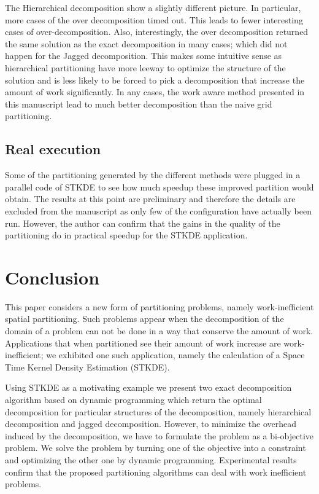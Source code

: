 \documentclass[10pt, conference, compsocconf]{IEEEtran}
\begin{document}
The Hierarchical decomposition show a slightly different picture. In
particular, more cases of the over decomposition timed out. This leads
to fewer interesting cases of over-decomposition. Also, interestingly,
the over decomposition returned the same solution as the exact
decomposition in many cases; which did not happen for the Jagged
decomposition. This makes some intuitive sense as hierarchical
partitioning have more leeway to optimize the structure of the
solution and is less likely to be forced to pick a decomposition that
increase the amount of work significantly. In any cases, the work aware
method presented in this manuscript lead to much better decomposition
than the naive grid partitioning.

\subsection{Real execution}

Some of the partitioning generated by the different methods were
plugged in a parallel code of STKDE to see how much speedup these
improved partition would obtain. The results at this point are
preliminary and therefore the details are excluded from the manuscript
as only few of the configuration have actually been run. However, the
author can confirm that the gains in the quality of the partitioning
do in practical speedup for the STKDE application.

\section{Conclusion}
\label{sec:ccl}

This paper considers a new form of partitioning problems, namely
work-inefficient spatial partitioning. Such problems appear when the
decomposition of the domain of a problem can not be done in a way that
conserve the amount of work. Applications that when partitioned see
their amount of work increase are work-inefficient; we exhibited one
such application, namely the calculation of a Space Time Kernel
Density Estimation (STKDE).

Using STKDE as a motivating example we present two exact decomposition
algorithm based on dynamic programming which return the optimal
decomposition for particular structures of the decomposition, namely
hierarchical decomposition and jagged decomposition. However, to
minimize the overhead induced by the decomposition, we have to
formulate the problem as a bi-objective problem. We solve the problem
by turning one of the objective into a constraint and optimizing the
other one by dynamic programming. Experimental results confirm that
the proposed partitioning algorithms can deal with work inefficient
problems.
\end{document}

